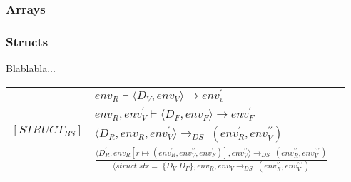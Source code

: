     
\noindent \subsubsection{Arrays}
    
    
    
\noindent \subsubsection{Structs}
Blablabla... 
\begin{semantik}
    \bgroup
    \def\arraystretch{2}
    \begin{table}[H]
    \centering
    \begin{tabular}{l c l}
        
        \multirow{4}{*}{$[STRUCT_{BS}]$} &
        \multicolumn{1}{l}{$ env_R \vdash \langle D_V, env_V \rangle \rightarrow env_v^\prime$} \\
        
        & \multicolumn{1}{l}{$ env_R, env_V^\prime \vdash \langle D_F, env_F \rangle \rightarrow env_F^\prime $} \\
        
        & \multicolumn{1}{l}{$ \langle D_R, env_R, env_V^\prime \rangle \rightarrow_{DS}\;(env_R^\prime, env_V^{\prime\prime}) $} \\
        
        
        & \multicolumn{1}{l}{$ \frac
            {
              \langle D_R^\prime, env_R[r \mapsto (env_R^\prime, env_V^{\prime\prime}, env_F^\prime)], env_V^{\prime\prime} \rangle                                       \rightarrow_{DS}\;(env_R^{\prime\prime}, env_V^{\prime\prime\prime})
            }
            {
                \langle struct\;str =\;\{ D_V\;D_F \}, env_R, env_V \rightarrow_{DS}\;(env_R^{\prime\prime}, env_V^{\prime\prime\prime})
            } 
        $}
        
    \end{tabular}
    \label{tab:structs}
    \end{table}
    \egroup
    \caption{Structs}
\end{semantik}

